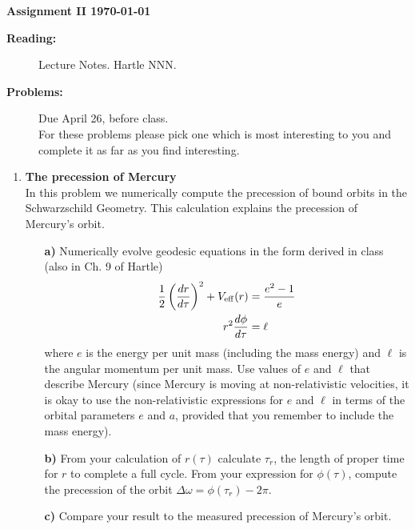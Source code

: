 \documentclass[11pt]{article}
\begin{document}
%
\centerline{\large\bf  \hfill Assignment II \hfill  \today}

\medskip
\begin{description}
\item[{\bf Reading:}] Lecture Notes. Hartle NNN. \\
\item[{\bf Problems:} \hfill ] Due April 26, before class. \\
For these problems please pick one which is most interesting to you and complete it as far as you find interesting.
\end{description}


\medskip

\begin{enumerate}

\item
{\bf The precession of Mercury} \\
In this problem we numerically compute the precession of bound orbits in the Schwarzschild Geometry. This calculation explains the precession of Mercury's orbit.

\begin{itemize}

\item[\bf a)] Numerically evolve geodesic equations in the form derived in class (also in Ch. 9 of Hartle)
\begin{align}
\frac{1}{2}\left(\frac{dr}{d\tau}\right)^2+ V_{\rm eff}(r)&=\frac{e^2-1}{e} \nonumber \\
r^2\frac{d\phi}{d\tau}&=\ell
\end{align}
where $e$ is the energy per unit mass (including the mass energy) and $\ell$ is the angular momentum per unit mass. Use values of $e$ and $\ell$ that describe Mercury (since Mercury is moving at non-relativistic velocities, it is okay to use the non-relativistic expressions for $e$ and $\ell$ in terms of the orbital parameters $e$ and $a$, provided that you remember to include the mass energy).

\item[\bf b)] From your calculation of $r(\tau)$ calculate $\tau_r$, the length of proper time for $r$ to complete a full cycle. From your expression for $\phi(\tau)$, compute the precession of the orbit $\Delta \omega =\phi(\tau_r)-2\pi$.

\item[\bf c)] Compare your result to the measured precession of Mercury's orbit.

\end{itemize}


\end{enumerate}
\end{document}
